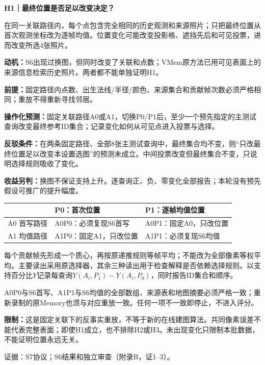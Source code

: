 \documentclass[11pt,a4paper,fontset=none]{ctexart}
\newcommand{\smallhead}[1]{\vspace{4pt}{\large\bfseries\color{hypothesis1}#1}\par}
\newcommand{\docref}[1]{{\small\color{darkgray}证据：#1。}}
\begin{document}
\newpage
{\LARGE\bfseries\color{hypothesis1}H1｜最终位置是否足以改变决定？}\par
\begin{hypothesisbox1}[解释与成立前提]
在同一关联路径内，每个点包含完全相同的历史观测和来源照片；只把最终位置从首次观测坐标改为逐帧均值。位置变化可能改变投影格、遮挡先后和可见投票，进而改变所选4张照片。

\textbf{动机：}S6出现过换图，但同时改变了关联和点数；VMem原方法已用可见表面上的来源信息检索历史照片。两者都不能单独证明H1。\citep{vmem}

\textbf{前提：}固定路径内点数、出生法线/半径/颜色、来源集合和贡献帧次数必须严格相同；重放不得重新寻找邻居。
\end{hypothesisbox1}

\begin{predictionbox}[预测与可反驳条件]
\textbf{操作化预测：}固定关联路径A0或A1，切换P0/P1后，至少一个预先指定的主测试查询改变最终参考ID集合；记录变化如何从可见点进入投票与选择。

\textbf{反驳条件：}在两条固定路径、全部8张主测试查询中，最终集合均不变，则“只改最终位置足以改变本设置选图”的预测未成立。中间投票改变但最终集合不变，只说明选择规则吸收了变化。

\textbf{收益另判：}换图不保证支持上升。逐查询正、负、零变化全部报告；本轮没有预先假设可推广的提升幅度。
\end{predictionbox}

\smallhead{设计：两条固定路径内分别比较}
\begin{tabularx}{\linewidth}{@{}p{23mm}XX@{}}
\toprule
 & \textbf{P0：首次位置} & \textbf{P1：逐帧均值位置}\\
\midrule
A0 首写路径 & A0P0：必须复现S6首写 & A0P1：固定A0，只改位置\\
A1 均值路径 & A1P0：固定A1，只改位置 & A1P1：必须复现S6均值\\
\bottomrule
\end{tabularx}

每个贡献帧先形成一个质心，再按原递推规则等帧平均；不能改为全部像素等权平均。主要读出采用原选择器，其余三种读出用于检查解释是否依赖选择规则。以支持百分比$Y$记录每查询$Y(A_i,P_1)-Y(A_i,P_0)$，同时报告ID集合和顺序。

\begin{comparisonbox}
A0P0与S6首写、A1P1与S6均值的全部数组、来源表和地图摘要必须严格一致；重新录制的原Memory也须与对应重放一致。任何一项不一致即停止，不进入评分。
\end{comparisonbox}

\textbf{限制：}这是固定关联下的反事实重放，不等于新的在线建图算法。共同像素误差不能代表完整表面；即使H1成立，也不排除H2或H3。未出现变化只限制本批数据，不能证明位置永远无关。\par
\docref{S7协议；S6结果和独立审查（附录B，证1--3）}
\end{document}
